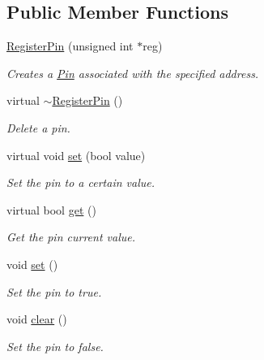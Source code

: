 \subsection*{Public Member Functions}
\begin{CompactItemize}
\item 
\hyperlink{classmprace_1_1RegisterPin_a0}{Register\-Pin} (unsigned int $\ast$reg)
\begin{CompactList}\small\item\em Creates a \hyperlink{classmprace_1_1Pin}{Pin} associated with the specified address. \item\end{CompactList}\item 
virtual \hyperlink{classmprace_1_1RegisterPin_a1}{$\sim$Register\-Pin} ()
\begin{CompactList}\small\item\em Delete a pin. \item\end{CompactList}\item 
virtual void \hyperlink{classmprace_1_1RegisterPin_a2}{set} (bool value)
\begin{CompactList}\small\item\em Set the pin to a certain value. \item\end{CompactList}\item 
virtual bool \hyperlink{classmprace_1_1RegisterPin_a3}{get} ()
\begin{CompactList}\small\item\em Get the pin current value. \item\end{CompactList}\item 
void \hyperlink{classmprace_1_1RegisterPin_a4}{set} ()
\begin{CompactList}\small\item\em Set the pin to true. \item\end{CompactList}\item 
void \hyperlink{classmprace_1_1RegisterPin_a5}{clear} ()
\begin{CompactList}\small\item\em Set the pin to false. \item\end{CompactList}\end{CompactItemize}
